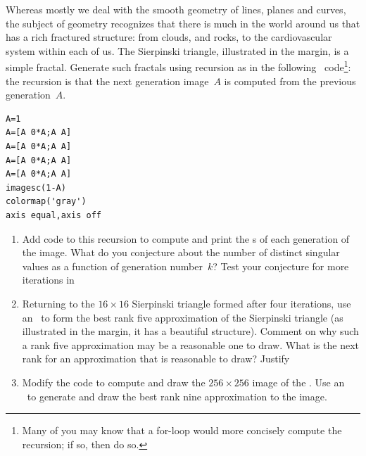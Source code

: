 \begin{exercise} \label{ex:siertri} 
Whereas mostly we deal with the smooth geometry of lines, planes and curves, 
the subject of  geometry recognizes that there is much in the world around us that has a rich fractured structure: from clouds, and rocks, to the cardiovascular system within each of us.
\marginpar{}
The Sierpinski triangle, illustrated in the margin, is a simple fractal.
Generate such fractals using recursion as in the following \script\ code\footnote{Many of you may know that a for-loop would more concisely compute the recursion; if so, then do so.}:
the recursion is that the next generation image~\(A\) is computed from the previous generation~\(A\).
\begin{verbatim}
A=1
A=[A 0*A;A A]
A=[A 0*A;A A]
A=[A 0*A;A A]
A=[A 0*A;A A]
imagesc(1-A)
colormap('gray')
axis equal,axis off
\end{verbatim}
%
\setbox\ajrqrbox\hbox{}%
\marginajrbox%
\begin{enumerate}
\item Add code to this recursion to compute and print the s of each generation of the  image.
What do you conjecture about the number of distinct singular values as a function of generation number~\(k\)?
Test your conjecture for more iterations in 

\item Returning to the \(16\times16\) Sierpinski triangle formed after four iterations, use an \svd\ to form the best rank five approximation of the Sierpinski triangle (as illustrated in the margin, it has a beautiful structure).  
\marginpar{}%
Comment on why such a rank five approximation may be a reasonable one to draw.  
What is the next rank for an approximation that is reasonable to draw?  Justify 

\item Modify the code to compute and draw the \(256\times256\) image of the .
Use an \svd\ to generate and draw the best rank nine approximation to the image.
\end{enumerate}
\end{exercise}



